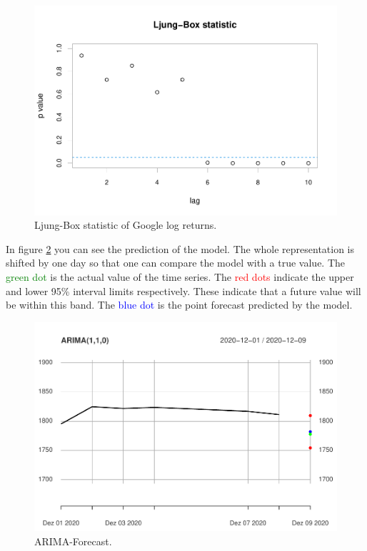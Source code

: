 \documentclass[
]{article}
\begin{document}
\begin{figure}

{\centering \includegraphics[width=0.7\linewidth]{00_main_files/figure-latex/chap2.2.1_1-1} 

}

\caption{Ljung-Box statistic of Google log returns.}\label{fig:chap2.2.1_1}
\end{figure}

In figure \ref{fig:chap2.2.1_2} you can see the prediction of the model.
The whole representation is shifted by one day so that one can compare
the model with a true value. The \textcolor{green}{green dot} is the
actual value of the time series. The \textcolor{red}{red dots} indicate
the upper and lower 95\% interval limits respectively. These indicate
that a future value will be within this band. The
\textcolor{blue}{blue dot} is the point forecast predicted by the model.

\newpage

\begin{figure}

{\centering \includegraphics[width=0.7\linewidth]{00_main_files/figure-latex/chap2.2.1_2-1} 

}

\caption{ARIMA-Forecast.}\label{fig:chap2.2.1_2}
\end{figure}
\end{document}
